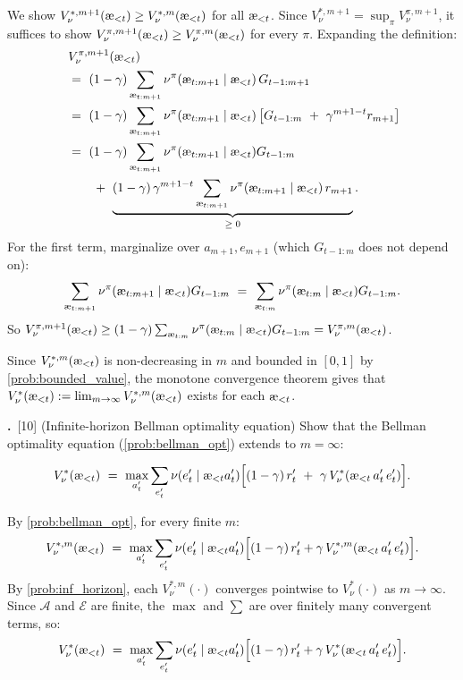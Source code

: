 \documentclass[fontsize=11pt, parskip=half]{scrartcl}
\theoremstyle{definition}
\newenvironment{solution}{%
    \begin{tcolorbox}[colback=black!5!white, colframe=black!50!white,
      title={\textbf{Solution}}, fonttitle=\normalfont, breakable]
  }{\end{tcolorbox}}
\newenvironment{solution}{\expandafter\comment}{\expandafter\endcomment}
\newcommand{\mysubsection}[2]{\par\medskip\noindent\refstepcounter{subsection}\textbf{\thesubsection.}~#2\par\smallskip}
\newcommand{\cA}{\mathcal{A}}
\newcommand{\cE}{\mathcal{E}}
\newcommand{\aes}{\textnormal{\ae}}
\begin{document}
\begin{solution}
We show $V_\nu^{*,m+1}(\aes_{<t}) \geq V_\nu^{*,m}(\aes_{<t})$ for all $\aes_{<t}$.
Since $V_\nu^{*,m+1} = \sup_\pi V_\nu^{\pi,m+1}$, it suffices to show $V_\nu^{\pi,m+1}(\aes_{<t}) \geq V_\nu^{\pi,m}(\aes_{<t})$ for every $\pi$.
Expanding the definition:
\begin{align*}
    & V_\nu^{\pi,m+1}(\aes_{<t}) \\
    ~&=~ (1-\gamma) \sum_{\aes_{t:m+1}} \nu^\pi(\aes_{t:m+1} \mid \aes_{<t})\, G_{t-1:m+1} \\
    ~&=~ (1-\gamma) \sum_{\aes_{t:m+1}} \nu^\pi(\aes_{t:m+1} \mid \aes_{<t}) \left[G_{t-1:m} ~+~ \gamma^{m+1-t} r_{m+1}\right] \\
    ~&=~ (1-\gamma) \sum_{\aes_{t:m+1}} \nu^\pi(\aes_{t:m+1} \mid \aes_{<t}) G_{t-1:m} \\
    ~&\qquad+~ \underbrace{(1-\gamma)\, \gamma^{m+1-t} \sum_{\aes_{t:m+1}} \nu^\pi(\aes_{t:m+1} \mid \aes_{<t})\, r_{m+1}}_{\geq\; 0}.
\end{align*}
For the first term, marginalize over $a_{m+1}, e_{m+1}$ (which $G_{t-1:m}$ does not depend on):
\[
    \sum_{\aes_{t:m+1}} \nu^\pi(\aes_{t:m+1} \mid \aes_{<t}) G_{t-1:m}
    ~=~ \sum_{\aes_{t:m}} \nu^\pi(\aes_{t:m} \mid \aes_{<t}) G_{t-1:m}.
\]
So $V_\nu^{\pi,m+1}(\aes_{<t}) \geq (1-\gamma) \sum_{\aes_{t:m}} \nu^\pi(\aes_{t:m} \mid \aes_{<t}) G_{t-1:m} = V_\nu^{\pi,m}(\aes_{<t})$.

Since $V_\nu^{*,m}(\aes_{<t})$ is non-decreasing in $m$ and bounded in $[0,1]$ by \cref{prob:bounded_value}, the monotone convergence theorem gives that $V_\nu^*(\aes_{<t}) := \lim_{m \to \infty} V_\nu^{*,m}(\aes_{<t})$ exists for each $\aes_{<t}$.
\end{solution}

\mysubsection{6}{[10] (Infinite-horizon Bellman optimality equation)\label{prob:inf_bellman_opt}
Show that the Bellman optimality equation (\cref{prob:bellman_opt}) extends to $m = \infty$:}
\[
    V_\nu^*(\aes_{<t}) ~=~ \max_{a'_t} \sum_{e'_t} \nu(e'_t \mid \aes_{<t} a'_t) \Big[(1-\gamma)\, r'_t ~+~ \gamma\, V_\nu^*(\aes_{<t}\, a'_t\, e'_t)\Big].
\]


\begin{solution}
By \cref{prob:bellman_opt}, for every finite $m$:
\[
    V_\nu^{*,m}(\aes_{<t}) ~=~ \max_{a'_t} \sum_{e'_t} \nu(e'_t \mid \aes_{<t} a'_t) \Big[(1-\gamma)\, r'_t + \gamma\, V_\nu^{*,m}(\aes_{<t}\, a'_t\, e'_t)\Big].
\]
By \cref{prob:inf_horizon}, each $V_\nu^{*,m}(\cdot)$ converges pointwise to $V_\nu^*(\cdot)$ as $m \to \infty$.
Since $\cA$ and $\cE$ are finite, the $\max$ and $\sum$ are over finitely many convergent terms, so:
\[
    V_\nu^*(\aes_{<t}) ~=~ \max_{a'_t} \sum_{e'_t} \nu(e'_t \mid \aes_{<t} a'_t) \Big[(1-\gamma)\, r'_t + \gamma\, V_\nu^*(\aes_{<t}\, a'_t\, e'_t)\Big].
\]
\end{solution}
\end{document}
